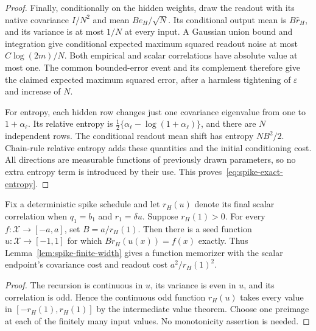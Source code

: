 \begin{proof}
Finally, conditionally on the hidden weights, draw the readout with its native covariance $I/N^2$ and mean $B e_H/\sqrt N$. Its conditional output mean is $B\widehat r_H$, and its variance is at most $1/N$ at every input. A Gaussian union bound and integration give conditional expected maximum squared readout noise at most $C\log(2m)/N$. Both empirical and scalar correlations have absolute value at most one. The common bounded-error event and its complement therefore give the claimed expected maximum squared error, after a harmless tightening of $\varepsilon$ and increase of $N$.

For entropy, each hidden row changes just one covariance eigenvalue from one to $1+\alpha_\ell$. Its relative entropy is
$\tfrac12\{\alpha_\ell-\log(1+\alpha_\ell)\}$, and there are $N$ independent rows. The conditional readout mean shift has entropy $NB^2/2$. Chain-rule relative entropy adds these quantities and the initial conditioning cost. All directions are measurable functions of previously drawn parameters, so no extra entropy term is introduced by their use. This proves~\eqref{eq:spike-exact-entropy}.
\end{proof}

\begin{corollary}
\label{cor:spike-ivt}
Fix a deterministic spike schedule and let $r_H(u)$ denote its final scalar correlation when $q_1=b_1$ and $r_1=\delta u$. Suppose $r_H(1)>0$. For every $f:\mathcal X\to[-a,a]$, set $B=a/r_H(1)$. Then there is a seed function $u:\mathcal X\to[-1,1]$ for which $B r_H(u(x))=f(x)$ exactly. Thus Lemma~\ref{lem:spike-finite-width} gives a function memorizer with the scalar endpoint's covariance cost and readout cost $a^2/r_H(1)^2$.
\end{corollary}
\begin{proof}
The recursion is continuous in $u$, its variance is even in $u$, and its correlation is odd. Hence the continuous odd function $r_H(u)$ takes every value in $[-r_H(1),r_H(1)]$ by the intermediate value theorem. Choose one preimage at each of the finitely many input values. No monotonicity assertion is needed.
\end{proof}
